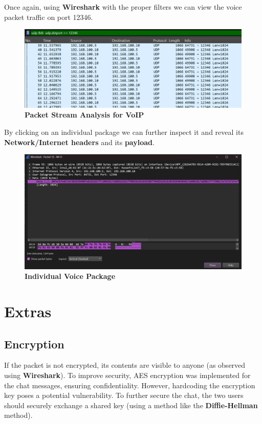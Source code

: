 \documentclass[a4paper,12pt]{article}
\begin{document}
\vspace{0.5cm}
Once again, using \textbf{Wireshark} with the proper filters we can view the voice packet traffic on port 12346.

\begin{figure}[H]
    \centering
    \includegraphics[width=1\linewidth]{assets/Call Stream.png}
    \caption{\textbf{Packet Stream Analysis for VoIP}}
    \label{fig:call-stream}
\end{figure}

By clicking on an individual package we can further inspect it and reveal its \textbf{Network/Internet headers} and its \textbf{payload}.
\begin{figure}[H]
    \centering
    \includegraphics[width=1\linewidth]{assets/Voice Package.png}
    \caption{\textbf{Individual Voice Package}}
    \label{fig:enter-label}
\end{figure}

\section{Extras}

\subsection{Encryption}
If the packet is not encrypted, its contents are visible to anyone (as observed using \textbf{Wireshark}). To improve security, AES encryption was implemented for the chat messages, ensuring confidentiality. However, hardcoding the encryption key poses a potential vulnerability. To further secure the chat, the two users should securely exchange a shared key (using a method like the \textbf{Diffie-Hellman} method).
\end{document}
